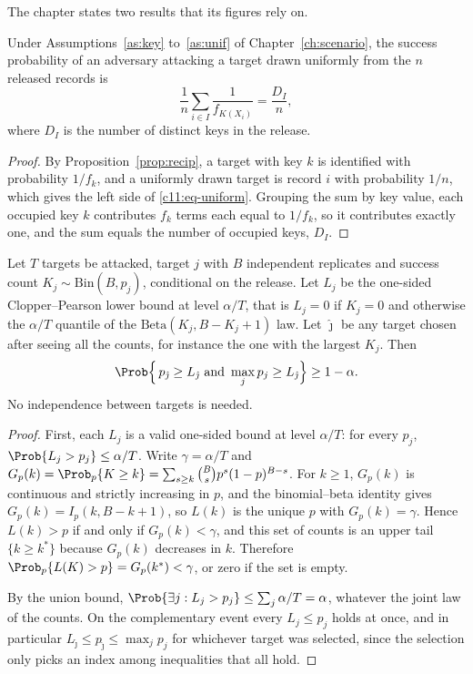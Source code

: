 The chapter states two results that its figures rely on.

\begin{proposition}\label{c11:prop-uniform}
Under Assumptions~\ref{as:key} to~\ref{as:unif} of Chapter~\ref{ch:scenario}, the
success probability of an adversary attacking a target drawn uniformly from the $n$
released records is
\begin{equation}\label{c11:eq-uniform}
\frac{1}{n}\sum_{i \in I}\frac{1}{f_{K(X_i)}} = \frac{D_I}{n},
\end{equation}
where $D_I$ is the number of distinct keys in the release.
\end{proposition}

\begin{proof}
By Proposition~\ref{prop:recip}, a target with key $k$ is identified with probability
$1/f_k$, and a uniformly drawn target is record $i$ with probability $1/n$, which
gives the left side of \eqref{c11:eq-uniform}. Grouping the sum by key value, each
occupied key $k$ contributes $f_k$ terms each equal to $1/f_k$, so it contributes
exactly one, and the sum equals the number of occupied keys, $D_I$.
\end{proof}

\begin{proposition}\label{c11:prop-worst}
Let $T$ targets be attacked, target $j$ with $B$ independent replicates and success
count $K_j \sim \mathrm{Bin}(B, p_j)$, conditional on the release. Let $L_j$ be the
one-sided Clopper--Pearson lower bound at level $\alpha/T$, that is $L_j = 0$ if
$K_j = 0$ and otherwise the $\alpha/T$ quantile of the $\mathrm{Beta}(K_j, B-K_j+1)$
law. Let $\hat\jmath$ be any target chosen after seeing all the counts, for instance
the one with the largest $K_j$. Then
\[
\Prob\Bigl\{\, p_{\hat\jmath} \ge L_{\hat\jmath}\ \text{and}\ \max_j p_j \ge L_{\hat\jmath} \Bigr\} \ge 1 - \alpha .
\]
No independence between targets is needed.
\end{proposition}

\begin{proof}
First, each $L_j$ is a valid one-sided bound at level $\alpha/T$: for every $p_j$,
$\Prob\{L_j > p_j\} \le \alpha/T$. Write $\gamma = \alpha/T$ and
$G_p(k) = \Prob_p\{K \ge k\} = \sum_{s \ge k}\binom{B}{s}p^s(1-p)^{B-s}$. For
$k \ge 1$, $G_p(k)$ is continuous and strictly increasing in $p$, and the
binomial--beta identity gives $G_p(k) = I_p(k, B-k+1)$, so $L(k)$ is the unique $p$
with $G_p(k) = \gamma$. Hence $L(k) > p$ if and only if $G_p(k) < \gamma$, and this
set of counts is an upper tail $\{k \ge k^\ast\}$ because $G_p(k)$ decreases in $k$.
Therefore $\Prob_p\{L(K) > p\} = G_p(k^\ast) < \gamma$, or zero if the set is empty.

By the union bound,
$\Prob\{\exists j: L_j > p_j\} \le \sum_j \alpha/T = \alpha$, whatever the joint law
of the counts. On the complementary event every $L_j \le p_j$ holds at once, and in
particular $L_{\hat\jmath} \le p_{\hat\jmath} \le \max_j p_j$ for whichever target
was selected, since the selection only picks an index among inequalities that all
hold.
\end{proof}

